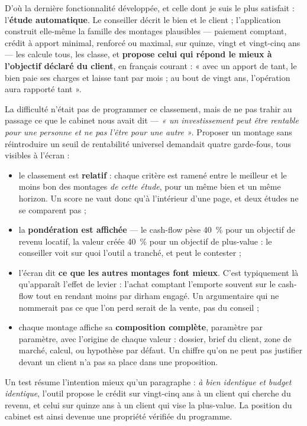 \documentclass[12pt,a4paper]{article}
\begin{document}
D'où la dernière fonctionnalité développée, et celle dont je suis le plus
satisfait : l'\textbf{étude automatique}. Le conseiller décrit le bien et le
client ; l'application construit elle-même la famille des montages plausibles
--- paiement comptant, crédit à apport minimal, renforcé ou maximal, sur quinze,
vingt et vingt-cinq ans --- les calcule tous, les classe, et \textbf{propose
celui qui répond le mieux à l'objectif déclaré du client}, en français courant :
« avec un apport de tant, le bien paie ses charges et laisse tant par mois ; au
bout de vingt ans, l'opération aura rapporté tant ».

La difficulté n'était pas de programmer ce classement, mais de ne pas trahir au
passage ce que le cabinet nous avait dit --- \emph{« un investissement peut être
rentable pour une personne et ne pas l'être pour une autre »}. Proposer un
montage sans réintroduire un seuil de rentabilité universel demandait quatre
garde-fous, tous visibles à l'écran :

\begin{itemize}
	\item le classement est \textbf{relatif} : chaque critère est ramené entre le
	meilleur et le moins bon des montages \emph{de cette étude}, pour un même bien
	et un même horizon. Un score ne vaut donc qu'à l'intérieur d'une page, et deux
	études ne se comparent pas ;
	\item la \textbf{pondération est affichée} --- le cash-flow pèse 40~\% pour un
	objectif de revenu locatif, la valeur créée 40~\% pour un objectif de
	plus-value : le conseiller voit sur quoi l'outil a tranché, et peut le
	contester ;
	\item l'écran dit \textbf{ce que les autres montages font mieux}. C'est
	typiquement là qu'apparaît l'effet de levier : l'achat comptant l'emporte
	souvent sur le cash-flow tout en rendant moins par dirham engagé. Un
	argumentaire qui ne nommerait pas ce que l'on perd serait de la vente, pas du
	conseil ;
	\item chaque montage affiche sa \textbf{composition complète}, paramètre par
	paramètre, avec l'origine de chaque valeur : dossier, brief du client, zone de
	marché, calcul, ou hypothèse par défaut. Un chiffre qu'on ne peut pas
	justifier devant un client n'a pas sa place dans une proposition.
\end{itemize}

Un test résume l'intention mieux qu'un paragraphe : \emph{à bien identique et
budget identique}, l'outil propose le crédit sur vingt-cinq ans à un client qui
cherche du revenu, et celui sur quinze ans à un client qui vise la plus-value.
La position du cabinet est ainsi devenue une propriété vérifiée du programme.
\end{document}
